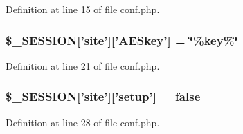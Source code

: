 \-Definition at line 15 of file conf.\-php.

\hypertarget{lib_2site__setup_2conf_8php_acdbd078321573ede00f1ba490a914deb}{
\subsubsection[{\$\-\_\-\-S\-E\-S\-S\-I\-O\-N}]{\setlength{\rightskip}{0pt plus 5cm}\$\-\_\-\-S\-E\-S\-S\-I\-O\-N\mbox{[}'site'\mbox{]}\mbox{[}'\-A\-E\-Skey'\mbox{]} = \char`\"{}\%key\%\char`\"{}}}\label{lib_2site__setup_2conf_8php_acdbd078321573ede00f1ba490a914deb}


\-Definition at line 21 of file conf.\-php.

\hypertarget{lib_2site__setup_2conf_8php_aecebd34109af039a13c90ba0f51db8fc}{
\subsubsection[{\$\-\_\-\-S\-E\-S\-S\-I\-O\-N}]{\setlength{\rightskip}{0pt plus 5cm}\$\-\_\-\-S\-E\-S\-S\-I\-O\-N\mbox{[}'site'\mbox{]}\mbox{[}'setup'\mbox{]} = false}}\label{lib_2site__setup_2conf_8php_aecebd34109af039a13c90ba0f51db8fc}


\-Definition at line 28 of file conf.\-php.

